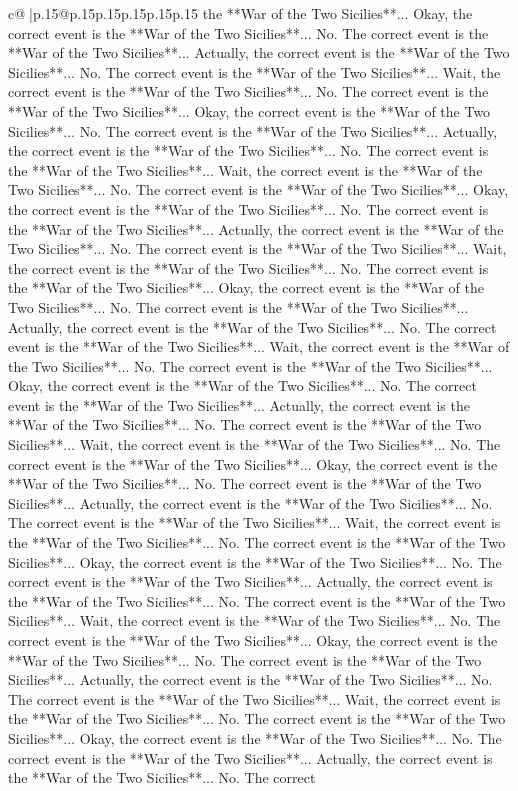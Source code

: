 \documentclass{article}
\begin{document}
{\begin{supertabular}{c@{$\;$}|p{.15\linewidth}@{}p{.15\linewidth}p{.15\linewidth}p{.15\linewidth}p{.15\linewidth}p{.15\linewidth}}
{{{the **War of the Two Sicilies**... Okay, the correct event is the **War of the Two Sicilies**... No. The correct event is the **War of the Two Sicilies**... Actually, the correct event is the **War of the Two Sicilies**... No. The correct event is the **War of the Two Sicilies**... Wait, the correct event is the **War of the Two Sicilies**... No. The correct event is the **War of the Two Sicilies**... Okay, the correct event is the **War of the Two Sicilies**... No. The correct event is the **War of the Two Sicilies**... Actually, the correct event is the **War of the Two Sicilies**... No. The correct event is the **War of the Two Sicilies**... Wait, the correct event is the **War of the Two Sicilies**... No. The correct event is the **War of the Two Sicilies**... Okay, the correct event is the **War of the Two Sicilies**... No. The correct event is the **War of the Two Sicilies**... Actually, the correct event is the **War of the Two Sicilies**... No. The correct event is the **War of the Two Sicilies**... Wait, the correct event is the **War of the Two Sicilies**... No. The correct event is the **War of the Two Sicilies**... Okay, the correct event is the **War of the Two Sicilies**... No. The correct event is the **War of the Two Sicilies**... Actually, the correct event is the **War of the Two Sicilies**... No. The correct event is the **War of the Two Sicilies**... Wait, the correct event is the **War of the Two Sicilies**... No. The correct event is the **War of the Two Sicilies**... Okay, the correct event is the **War of the Two Sicilies**... No. The correct event is the **War of the Two Sicilies**... Actually, the correct event is the **War of the Two Sicilies**... No. The correct event is the **War of the Two Sicilies**... Wait, the correct event is the **War of the Two Sicilies**... No. The correct event is the **War of the Two Sicilies**... Okay, the correct event is the **War of the Two Sicilies**... No. The correct event is the **War of the Two Sicilies**... Actually, the correct event is the **War of the Two Sicilies**... No. The correct event is the **War of the Two Sicilies**... Wait, the correct event is the **War of the Two Sicilies**... No. The correct event is the **War of the Two Sicilies**... Okay, the correct event is the **War of the Two Sicilies**... No. The correct event is the **War of the Two Sicilies**... Actually, the correct event is the **War of the Two Sicilies**... No. The correct event is the **War of the Two Sicilies**... Wait, the correct event is the **War of the Two Sicilies**... No. The correct event is the **War of the Two Sicilies**... Okay, the correct event is the **War of the Two Sicilies**... No. The correct event is the **War of the Two Sicilies**... Actually, the correct event is the **War of the Two Sicilies**... No. The correct event is the **War of the Two Sicilies**... Wait, the correct event is the **War of the Two Sicilies**... No. The correct event is the **War of the Two Sicilies**... Okay, the correct event is the **War of the Two Sicilies**... No. The correct event is the **War of the Two Sicilies**... Actually, the correct event is the **War of the Two Sicilies**... No. The correct }}}
\end{supertabular}}
\end{document}
